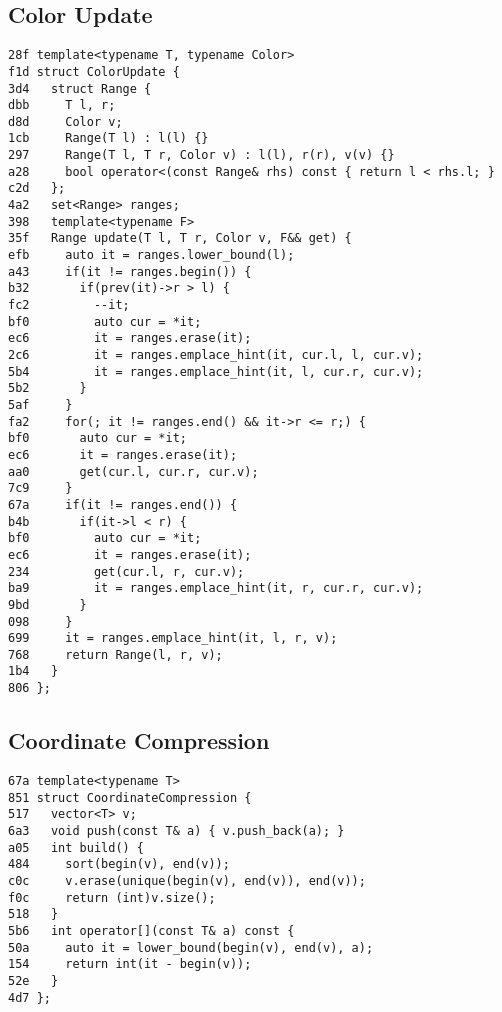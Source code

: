\documentclass[10pt, a4paper, twoside]{article}
\begin{document}
\subsection{Color Update}
\begin{lstlisting}
28f template<typename T, typename Color>
f1d struct ColorUpdate {
3d4   struct Range {
dbb     T l, r;
d8d     Color v;
1cb     Range(T l) : l(l) {}
297     Range(T l, T r, Color v) : l(l), r(r), v(v) {}
a28     bool operator<(const Range& rhs) const { return l < rhs.l; }
c2d   };
4a2   set<Range> ranges;
398   template<typename F>
35f   Range update(T l, T r, Color v, F&& get) {
efb     auto it = ranges.lower_bound(l);
a43     if(it != ranges.begin()) {
b32       if(prev(it)->r > l) {
fc2         --it;
bf0         auto cur = *it;
ec6         it = ranges.erase(it);
2c6         it = ranges.emplace_hint(it, cur.l, l, cur.v);
5b4         it = ranges.emplace_hint(it, l, cur.r, cur.v);
5b2       }
5af     }
fa2     for(; it != ranges.end() && it->r <= r;) {
bf0       auto cur = *it;
ec6       it = ranges.erase(it);
aa0       get(cur.l, cur.r, cur.v);
7c9     }
67a     if(it != ranges.end()) {
b4b       if(it->l < r) {
bf0         auto cur = *it;
ec6         it = ranges.erase(it);
234         get(cur.l, r, cur.v);
ba9         it = ranges.emplace_hint(it, r, cur.r, cur.v);
9bd       }
098     }
699     it = ranges.emplace_hint(it, l, r, v);
768     return Range(l, r, v);
1b4   }
806 };
\end{lstlisting}

\subsection{Coordinate Compression}
\begin{lstlisting}
67a template<typename T>
851 struct CoordinateCompression {
517   vector<T> v;
6a3   void push(const T& a) { v.push_back(a); }
a05   int build() {
484     sort(begin(v), end(v));
c0c     v.erase(unique(begin(v), end(v)), end(v));
f0c     return (int)v.size();
518   }
5b6   int operator[](const T& a) const {
50a     auto it = lower_bound(begin(v), end(v), a);
154     return int(it - begin(v));
52e   }
4d7 };
\end{lstlisting}
\end{document}
